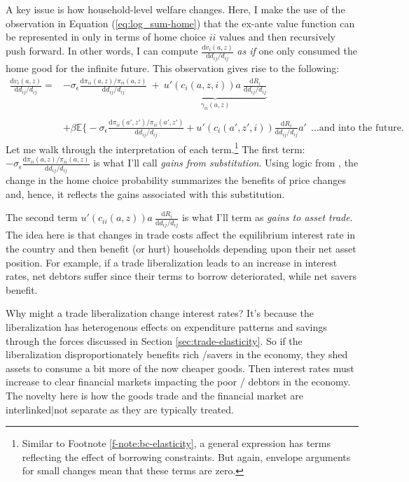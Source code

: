\documentclass[12pt,pdftex]{article}
\begin{document}
\begin{onehalfspacing}
A key issue is how household-level welfare changes. Here, I make the use of the observation in Equation (\ref{eq:log_sum-home}) that the ex-ante value function can be represented in only in terms of home choice $ii$ values and then recursively push forward. In other words, I can compute $\frac{\mathrm{d} v_i(a, z)}{\mathrm{d} d_{ij} / d_{ij}}$ \emph{as if} one only consumed the home good for the infinite future. This observation gives rise to the following:
\begin{align}
\frac{\mathrm{d} v_i(a, z)}{\mathrm{d} d_{ij} / d_{ij}} =& -\sigma_{\epsilon} \frac{\mathrm{d} \pi_{ii}(a,z) / \pi_{ii}(a,z)}{\mathrm{d}d_{ij} / d_{ij}} \ + \ \underbrace{u'(c_{i}(a,z,i))a \ \frac{\mathrm{d} R_{i}}{\mathrm{d} d_{ij} / d_{ij}}}_{\gamma_{ii}(a,z)} \\
\nonumber \\
& + \beta \mathbb{E} \bigg \{ -\sigma_{\epsilon} \frac{\mathrm{d} \pi_{ii}(a',z') / \pi_{ii}(a',z')}{\mathrm{d}d_{ij} / d_{ij}} +  u'(c_{i}(a',z',i))\frac{\mathrm{d} R_{i}}{\mathrm{d} d_{ij} / d_{ij}}a' \ \  \ldots \mbox{and into the future.} \nonumber
\end{align}
Let me walk through the interpretation of each term.\footnote{Similar to Footnote \ref{f-note:bc-elasticity}, a general expression has terms reflecting the effect of borrowing constraints. But again, envelope arguments for small changes mean that these terms are zero.} The first term: $-\sigma_{\epsilon} \frac{\mathrm{d} \pi_{ii}(a,z) / \pi_{ii}(a,z)}{\mathrm{d}d_{ij} / d_{ij}}$ is what I'll call \emph{gains from substitution}. Using logic from \citet{arkolakis2012new}, the change in the home choice probability summarizes the benefits of price changes and, hence, it reflects the gains associated with this substitution.

The second term $u'(c_{ii}(a,z))a \ \frac{\mathrm{d} R_{i}}{\mathrm{d} d_{ij} / d_{ij}}$ is what I'll term as \emph{gains to asset trade}. The idea here is that changes in trade costs affect the equilibrium interest rate in the country and then benefit (or hurt) households depending upon their net asset position.  For example, if a trade liberalization leads to an increase in interest rates, net debtors suffer since their terms to borrow deteriorated, while net savers benefit.

Why might a trade liberalization change interest rates? It's because the liberalization has heterogenous effects on expenditure patterns and savings through the forces discussed in Section \ref{sec:trade-elasticity}. So if the liberalization disproportionately benefits rich /savers in the economy, they shed assets to consume a bit more of the now cheaper goods. Then interest rates must increase to clear financial markets impacting the poor / debtors in the economy. The novelty here is how the goods trade and the financial market are interlinked|not separate as they are typically treated.


\end{onehalfspacing}
\end{document}
